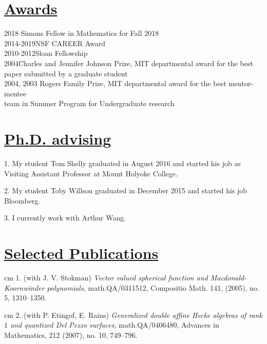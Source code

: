 \documentclass[11pt]{amsart}
\theoremstyle{plain}
\theoremstyle{definition}
\theoremstyle{remark}
\begin{document}
\section*{\Large\underline{Awards}}
\begin{tabbing}
2018  \quad\quad\quad\quad\quad                  Simons Fellow in Mathematics for Fall 2018 \\
2014-2019\quad\quad\quad NSF CAREER Award\\
2010-2012\quad\quad\quad Sloan Fellowship\\
2004\quad\quad\quad\quad\quad\;\= Charles and Jennifer Johnson
Prize, MIT departmental award
 for the best \\ \>paper submitted by a graduate student\\
2004, 2003\> Rogers Family Prize, MIT departmental award   for the
             best mentor-mentee\\ \>team in Summer Program for
             Undergraduate research\\
\end{tabbing}


\section*{\Large \underline{Ph.D. advising}}

\medskip

1. My student Tom Shelly graduated in August 2016 and started his job as Visiting Assistant Professor at Mount Holyoke College. 

2. My student Toby Willson graduated in December 2015 and started his job Bloomberg. 

3. I currently work with Arthur Wang.




\section*{\Large\underline{Selected Publications}}

\noindent{} cm 1. (with J. V. Stokman)  {\it Vector valued spherical
function and Macdonald-Koornwinder polynomials,}  math.QA/0311512,
Compositio Math.
 141, (2005), no. 5,   1310--1350.




\noindent{} cm 2. (with P. Etingof, E. Rains)
{\it  Generalized double affine
Hecke algebras of rank $1$ and quantized Del Pezzo surfaces,}
math.QA/0406480, Advances in Mathematics, 212
(2007), no. 10, 749--796.
\end{document}
